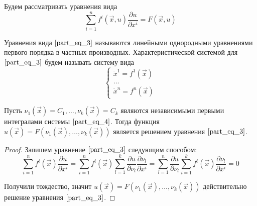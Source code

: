\documentclass[a4paper, 12pt]{article}
\begin{document}
    Будем рассматривать уравнения вида
    \begin{equation}
        \sum \limits_{i = 1}^{n} f^{i} (\overrightarrow{x}, u) \frac{\partial u}{\partial x^{i}} = F(\overrightarrow{x}, u)
        \label{part_eq_3}
    \end{equation}

    \begin{definition}
        Уравнения вида $\eqref{part_eq_3}$ называются линейными однородными уравнениями первого порядка в частных производных. Характеристической системой для $\eqref{part_eq_3}$ будем называть систему вида
        \begin{equation}
            \begin{cases}
                \dot{x}^1 = f^1(\overrightarrow{x}) \\
                \dots                                  \\
                \dot{x}^n = f^n(\overrightarrow{x})
            \end{cases}
            \label{part_eq_4}
        \end{equation}
    \end{definition}

    \begin{theorem}
        Пусть $\nu_1(\overrightarrow{x}) = C_1, \dots, \nu_k(\overrightarrow{x}) = C_k$ являются независимыми первыми интегралами системы $\eqref{part_eq_4}$. Тогда функция $u(\overrightarrow{x}) = F(\nu_1(\overrightarrow{x}), \dots, \nu_k(\overrightarrow{x}))$ является решением уравнения $\eqref{part_eq_3}$.
    \end{theorem}
    \begin{proof}
        Запишем уравнение $\eqref{part_eq_3}$ следующим способом:
        \begin{equation*}
            \sum \limits_{i = 1}^{n} f^{i} (\overrightarrow{x}) \frac{\partial u}{\partial x^{i}} = \sum \limits_{i = 1}^{n} f^{i} (\overrightarrow{x}) \sum \limits_{l = 1}^{k} \frac{\partial u}{\partial \nu_l} \frac{\partial \nu_l}{\partial x^{i}} = \sum \limits_{l = 1}^{n} \frac{\partial u}{\partial \nu_l} \sum \limits_{i = 1}^{k} f^{i} (\overrightarrow{x}) \frac{\partial \nu_l}{\partial x^{i}} = 0
        \end{equation*}

        Получили тождество, значит $u(\overrightarrow{x}) = F(\nu_1(\overrightarrow{x}), \dots, \nu_k(\overrightarrow{x}))$ действительно решение уравнения $\eqref{part_eq_3}$.
    \end{proof}
\end{document}
